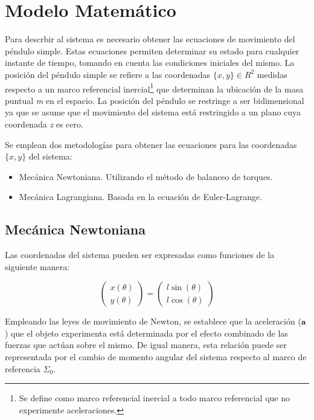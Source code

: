 \section{Modelo Matemático}

Para descrbir al sistema es necesario obtener las ecuaciones 
de movimiento del péndulo simple. 
Estas ecuaciones permiten 
determinar su estado para cualquier 
instante de tiempo, tomando en cuenta las condiciones 
iniciales del mismo. 
La posición del péndulo simple se refiere a 
las coordenadas  $\{x, y\} \in R^2$  medidas respecto a un marco 
referencial inercial\footnote{Se define como marco 
referencial inercial a todo marco referencial que no 
experimente aceleraciones.} 
que determinan la ubicación de 
la masa puntual \emph{m} en el espacio.
La posición del péndulo se restringe a ser bidimensional
ya que se asume que el movimiento del sistema está restringido a un plano
cuya coordenada \emph{z} es cero.

Se emplean dos metodologías para obtener las ecuaciones para las coordenadas 
$\{x, y\}$ del sistema:
\begin{itemize}
 \item Mecánica Newtoniana. Utilizando el método de balanceo de torques.
 \item Mecánica Lagrangiana. Basada en la ecuación de Euler-Lagrange.
\end{itemize}




\subsection{Mecánica Newtoniana}

Las coordenadas del sistema pueden ser expresadas como funciones
de la siguiente manera:

\begin{equation}
 \begin{pmatrix}
 x(\theta)\\
 y(\theta)
 \end{pmatrix}
 = \begin{pmatrix}
 l \sin (\theta)\\
 l \cos (\theta)
 \end{pmatrix}
 \label{eq: system coordinates}
\end{equation}

Empleando las leyes de movimiento de Newton, 
se establece que la aceleración ($\bold{a}$) que el objeto
experimenta está determinada por el
efecto combinado de las fuerzas que actúan sobre el mismo.
De igual manera, esta relación puede ser representada por
el cambio de momento angular del sistema respecto al 
marco de referencia $\Sigma_0$.

